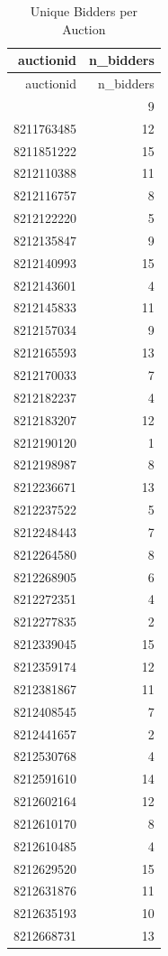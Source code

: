 \documentclass[
]{article}
\begin{document}
\begin{longtable}[]{@{}rr@{}}
\caption{Unique Bidders per Auction}\tabularnewline
\toprule\noalign{}
auctionid & n\_bidders \\
\midrule\noalign{}
\endfirsthead
\toprule\noalign{}
auctionid & n\_bidders \\
\midrule\noalign{}
\endhead
\bottomrule\noalign{}
\endlastfoot
8211480551 & 9 \\
8211763485 & 12 \\
8211851222 & 15 \\
8212110388 & 11 \\
8212116757 & 8 \\
8212122220 & 5 \\
8212135847 & 9 \\
8212140993 & 15 \\
8212143601 & 4 \\
8212145833 & 11 \\
8212157034 & 9 \\
8212165593 & 13 \\
8212170033 & 7 \\
8212182237 & 4 \\
8212183207 & 12 \\
8212190120 & 1 \\
8212198987 & 8 \\
8212236671 & 13 \\
8212237522 & 5 \\
8212248443 & 7 \\
8212264580 & 8 \\
8212268905 & 6 \\
8212272351 & 4 \\
8212277835 & 2 \\
8212339045 & 15 \\
8212359174 & 12 \\
8212381867 & 11 \\
8212408545 & 7 \\
8212441657 & 2 \\
8212530768 & 4 \\
8212591610 & 14 \\
8212602164 & 12 \\
8212610170 & 8 \\
8212610485 & 4 \\
8212629520 & 15 \\
8212631876 & 11 \\
8212635193 & 10 \\
8212668731 & 13 \\

\end{longtable}
\end{document}
